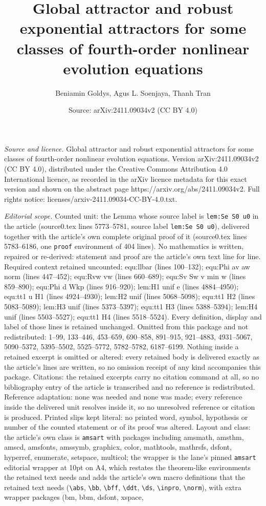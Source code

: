 \documentclass[10pt,a4paper]{amsart}
\title[Global attractor and robust exponential attractors for some ]{Global attractor and robust exponential attractors for some classes of fourth-order nonlinear evolution equations}
\author{Beniamin Goldys, Agus L. Soenjaya, Thanh Tran}
\date{Source: arXiv:2411.09034v2 (CC BY 4.0)}
\begin{document}
\maketitle

\noindent\emph{Source and licence.} Global attractor and robust exponential attractors for some classes of fourth-order nonlinear evolution equations. Version arXiv:2411.09034v2 (CC BY 4.0), distributed under the Creative Commons Attribution 4.0 International licence, as recorded in the arXiv licence metadata for this exact version and shown on the abstract page https://arxiv.org/abs/2411.09034v2. Full rights notice: licenses/arxiv-2411.09034-CC-BY-4.0.txt.\par\smallskip

\noindent\textit{Editorial scope.} Counted unit: the Lemma whose source label is \texttt{lem:Se S0 u0} in the article (source0.tex lines 5773--5781, source label \texttt{lem:Se S0 u0}), delivered together with the article's own complete original proof of it (source0.tex lines 5783--6186, one \texttt{proof} environment of 404 lines). No mathematics is written, repaired or re-derived: statement and proof are the article's own text line for line. Required context retained uncounted: equ:llbar (lines 100--132); equ:Phi av aw norm (lines 447--452); equ:Rvw vw (lines 660--689); equ:Sv Sw v min w (lines 859--890); equ:Phi d Wkp (lines 916--920); lem:H1 unif e (lines 4884--4950); equ:tt1 u H1 (lines 4924--4930); lem:H2 unif (lines 5068--5098); equ:tt1 H2 (lines 5083--5089); lem:H3 unif (lines 5373--5397); equ:tt1 H3 (lines 5388--5394); lem:H4 unif (lines 5503--5527); equ:tt1 H4 (lines 5518--5524). Every definition, display and label of those lines is retained unchanged. Omitted from this package and not redistributed: 1--99, 133--446, 453--659, 690--858, 891--915, 921--4883, 4931--5067, 5090--5372, 5395--5502, 5525--5772, 5782--5782, 6187--6199. Nothing inside a retained excerpt is omitted or altered: every retained body is delivered exactly as the article's lines are written, so no omission receipt of any kind accompanies this package. Citations: the retained excerpts carry no citation command at all, so no bibliography entry of the article is transcribed and no reference is redistributed. Reference adaptation: none was needed and none was made; every reference inside the delivered unit resolves inside it, so no unresolved reference or citation is produced. Printed slips kept literal: no printed word, symbol, hypothesis or number of the counted statement or of its proof was altered. Layout and class: the article's own class is \texttt{amsart} with packages including amsmath, amsthm, amscd, amsfonts, amssymb, graphicx, color, mathtools, mathrsfs, dsfont, hyperref, enumerate, setspace, multicol; the wrapper is the lane's pinned \texttt{amsart} editorial wrapper at 10pt on A4, which restates the theorem-like environments the retained text needs and adds the article's own macro definitions that the retained text needs (\texttt{\textbackslash abs}, \texttt{\textbackslash bb}, \texttt{\textbackslash bff}, \texttt{\textbackslash ddt}, \texttt{\textbackslash ds}, \texttt{\textbackslash inpro}, \texttt{\textbackslash norm}), with extra wrapper packages (bm, bbm, dsfont, xspace, 
\end{document}
